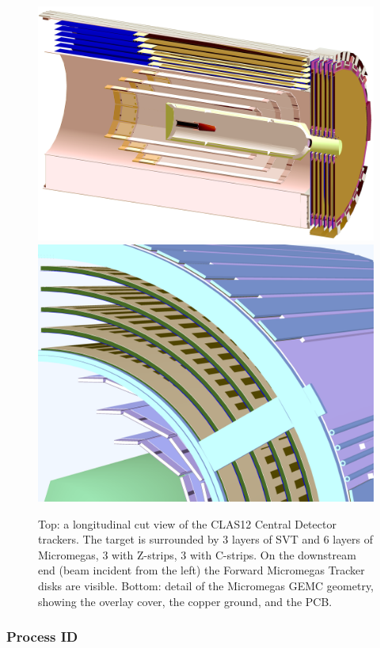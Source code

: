 \begin{figure}
	\centering
	\includegraphics[width=0.99\columnwidth,keepaspectratio]{img/bmtGeometry.png}
	\includegraphics[width=0.99\columnwidth,keepaspectratio]{img/bmtDetail.png}
	\caption{Top: a longitudinal cut view of the CLAS12 Central Detector trackers. The target is surrounded by 3 layers
          of SVT and 6 layers of Micromegas, 3 with Z-strips, 3 with C-strips. On the downstream end (beam incident from
          the left) the Forward Micromegas Tracker disks are visible. Bottom: detail of the Micromegas GEMC geometry,
          showing the overlay cover, the copper ground, and the PCB.}
	\label{fig:bmtGeometry}
\end{figure}

\subsubsection{Process ID}

